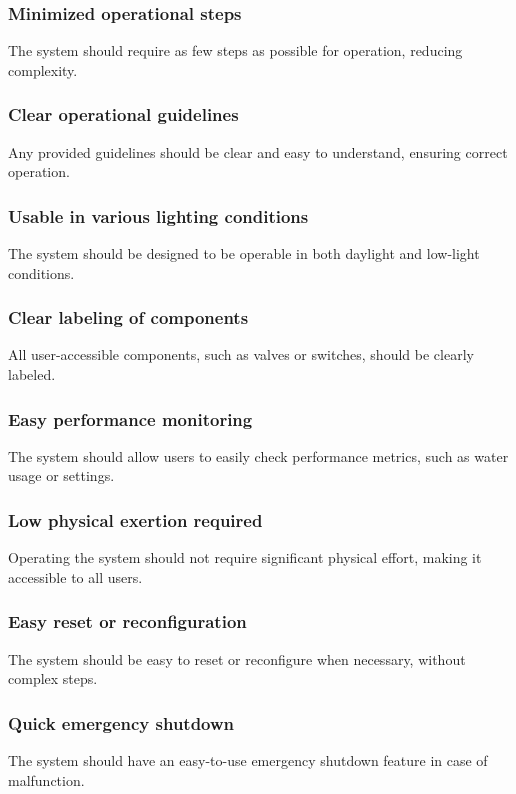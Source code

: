 \documentclass[12pt]{report}
\begin{document}
\subsubsection{Minimized operational steps}
The system should require as few steps as possible for operation, reducing complexity.

\subsubsection{Clear operational guidelines}
Any provided guidelines should be clear and easy to understand, ensuring correct operation.

\subsubsection{Usable in various lighting conditions}
The system should be designed to be operable in both daylight and low-light conditions.

\subsubsection{Clear labeling of components}
All user-accessible components, such as valves or switches, should be clearly labeled.

\subsubsection{Easy performance monitoring}
The system should allow users to easily check performance metrics, such as water usage or settings.

\subsubsection{Low physical exertion required}
Operating the system should not require significant physical effort, making it accessible to all users.

\subsubsection{Easy reset or reconfiguration}
The system should be easy to reset or reconfigure when necessary, without complex steps.

\subsubsection{Quick emergency shutdown}
The system should have an easy-to-use emergency shutdown feature in case of malfunction.
\end{document}
